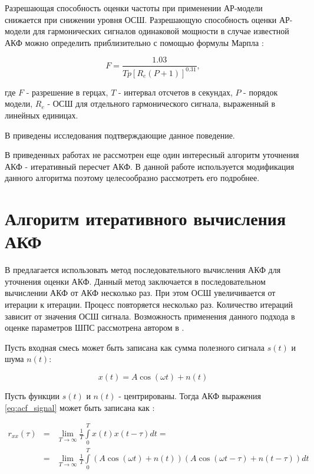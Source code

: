 Разрешающая способность оценки частоты при применении АР-модели снижается при снижении уровня ОСШ. Разрешающую способность оценки АР-модели для гармонических сигналов
одинаковой мощности в случае известной АКФ можно определить приблизительно с помощью формулы Марпла \cite{marpl_book, kay_ar_book}:
\begin{center}
\begin{equation}
	\label{eq:lpc_est_quality_1}
	F = \frac{1.03}{Tp[R_e(P+1)]^{0.31}},
\end{equation}
\end{center}
где ${F}$ - разрешение в герцах, ${T}$ - интервал отсчетов в секундах, ${P}$ - порядок модели, ${R_e}$ - ОСШ для отдельного гармонического сигнала, выраженный в линейных единицах.

В \cite{lacoss_spectral_est, chen_spectral_est, marple_1977} приведены исследования подтверждающие данное поведение.

В приведенных работах не рассмотрен еще один интересный алгоритм уточнения АКФ - итеративный пересчет АКФ. В данной работе используется
модификация данного алгоритма поэтому целесообразно рассмотреть его подробнее.

\section{Алгоритм итеративного вычисления АКФ}
\label{sec_ostanin}
В \cite{ostanin_akf} предлагается использовать метод последовательного вычисления АКФ для уточнения оценки АКФ. Данный метод
заключается в последовательном вычислении АКФ от АКФ несколько раз. При этом ОСШ увеличивается от итерации к итерации.
Процесс повторяется несколько раз. Количество итераций зависит от значения ОСШ сигнала. Возможность применения данного подхода в оценке параметров ШПС рассмотрена
автором в \cite{my_acf_cdma}.

Пусть входная смесь может быть записана как сумма полезного сигнала ${s(t)}$ и шума ${n(t)}$:
\begin{center}
\begin{equation}
	\label{eq:acf_signal}
	x(t) = A \cos{(\omega t)} + n(t)
\end{equation}
\end{center}

Пусть функции ${s(t)}$ и ${n(t)}$ - центрированы. Тогда АКФ выражения \ref{eq:acf_signal} может быть записана как \cite{book_max}:
\begin{center}
\begin{eqnarray}
	\label{eq:acf_rss_signal}
	r_{xx}(\tau)	& = & \lim_{T \to \infty} \frac{1}{T} \int \limits_0^T x(t)x(t-\tau)dt = \nonumber \\
			& = & \lim_{T \to \infty} \frac{1}{T} \int \limits_0^T (A \cos{(\omega t)} + n(t))(A \cos{(\omega t - \tau)} + n(t - \tau))dt
\end{eqnarray}
\end{center}

